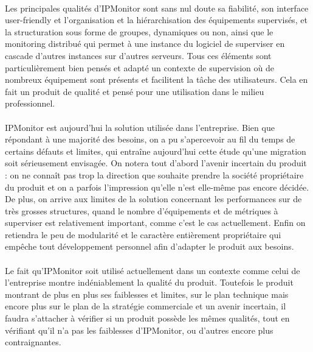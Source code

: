 \documentclass[a4paper,12pt]{report}
\begin{document}
\paragraph{}
Les principales qualités d'IPMonitor sont sans nul doute sa fiabilité, son interface user-friendly et l'organisation et la hiérarchisation des équipements supervisés, et la structuration sous forme de groupes, dynamiques ou non, ainsi que le monitoring distribué qui permet à une instance du logiciel de superviser en cascade d'autres instances sur d'autres serveurs. Tous ces éléments sont particulièrement bien pensés et adapté un contexte de supervision où de nombreux équipement sont présents et facilitent la tâche des utilisateurs. Cela en fait un produit de qualité et pensé pour une utilisation dans le milieu professionnel.

\paragraph{}
IPMonitor est aujourd'hui la solution utilisée dans l'entreprise. Bien que répondant à une majorité des besoins, on a pu s'apercevoir au fil du temps de certains défauts et limites, qui entraîne aujourd'hui cette étude qu'une migration soit sérieusement envisagée. On notera tout d'abord l'avenir incertain du produit : on ne connaît pas trop la direction que souhaite prendre la société propriétaire du produit et on a parfois l'impression qu'elle n'est elle-même pas encore décidée. De plus, on arrive aux limites de la solution concernant les performances sur de très grosses structures, quand le nombre d'équipements et de métriques à superviser est relativement important, comme c'est le cas actuellement. Enfin on retiendra le peu de modularité et le caractère entièrement propriétaire qui empêche tout développement personnel afin d'adapter le produit aux besoins.

\paragraph{}
Le fait qu'IPMonitor soit utilisé actuellement dans un contexte comme celui de l'entreprise montre indéniablement la qualité du produit. Toutefois le produit montrant de plus en plus ses faiblesses et limites, sur le plan technique mais encore plus sur le plan de la stratégie commerciale et un avenir incertain, il faudra s'attacher à vérifier si un produit possède les mêmes qualités, tout en vérifiant qu'il n'a pas les faiblesses d'IPMonitor, ou d'autres encore plus contraignantes.
\end{document}
